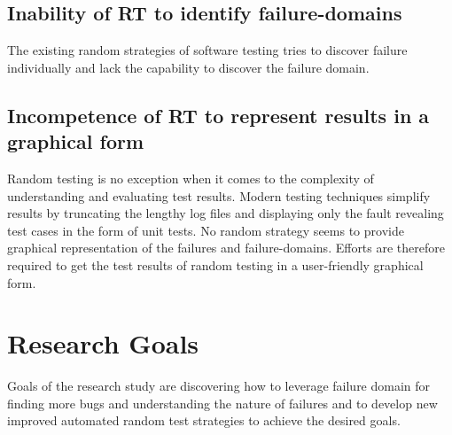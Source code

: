 \subsection{Inability of RT to identify failure-domains}
The existing random strategies of software testing tries to discover failure individually and lack the capability to discover the failure domain.


\subsection{Incompetence of RT to represent results in a graphical form}
Random testing is no exception when it comes to the complexity of understanding and evaluating test results. Modern testing techniques simplify results by truncating the lengthy log files and displaying only the fault revealing test cases in the form of unit tests. No random strategy seems to provide graphical representation of the failures and failure-domains. Efforts are therefore required to get the test results of random testing in a user-friendly graphical form. 


\section{Research Goals} \label{ResearchGoals}
Goals of the research study are discovering how to leverage failure domain for finding more bugs and understanding the nature of failures and to develop new improved automated random test strategies to achieve the desired goals.



